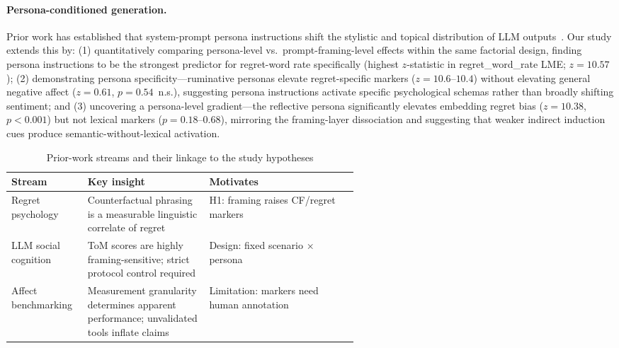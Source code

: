 \documentclass[conference,10pt]{IEEEtran}
\begin{document}
\paragraph{Persona-conditioned generation.}
Prior work has established that system-prompt persona instructions shift the stylistic and topical distribution of LLM outputs~\cite{shanahan2023roleplay, salewski2024impersonation}. Our study extends this by: (1) quantitatively comparing persona-level vs.\ prompt-framing-level effects within the same factorial design, finding persona instructions to be the strongest predictor for regret-word rate specifically (highest $z$-statistic in regret\_word\_rate LME; $z=10.57$); (2) demonstrating persona specificity---ruminative personas elevate regret-specific markers ($z=10.6$--$10.4$) without elevating general negative affect ($z=0.61$, $p=0.54$~n.s.), suggesting persona instructions activate specific psychological schemas rather than broadly shifting sentiment; and (3) uncovering a persona-level gradient---the reflective persona significantly elevates embedding regret bias ($z=10.38$, $p<0.001$) but not lexical markers ($p=0.18$--$0.68$), mirroring the framing-layer dissociation and suggesting that weaker indirect induction cues produce semantic-without-lexical activation.

\begin{table}[t]
\caption{Prior-work streams and their linkage to the study hypotheses}
\label{tab:litmap}
\scriptsize\centering
\setlength{\tabcolsep}{3pt}
\begin{tabularx}{\linewidth}{@{}>{\RaggedRight\arraybackslash}p{0.22\linewidth}
>{\RaggedRight\arraybackslash}p{0.35\linewidth}
>{\RaggedRight\arraybackslash}X@{}}
\toprule
\rowcolor{tableheader}
\textbf{Stream} & \textbf{Key insight} & \textbf{Motivates} \\
\midrule
Regret psychology & Counterfactual phrasing is a measurable linguistic correlate of regret & H1: framing raises CF/regret markers \\
LLM social cognition & ToM scores are highly framing-sensitive; strict protocol control required & Design: fixed scenario × persona \\
Affect benchmarking & Measurement granularity determines apparent performance; unvalidated tools inflate claims & Limitation: markers need human annotation \\
\bottomrule
\end{tabularx}
\end{table}
\setlength{\tabcolsep}{3pt}
\end{document}
